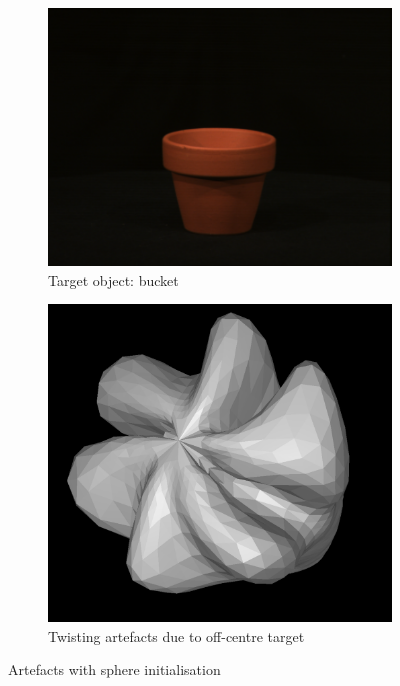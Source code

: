 \documentclass{article}
\begin{document}
\begin{figure}[h!]
  \centering
  \begin{subfigure}{0.25\textwidth}
    \centering
      \includegraphics[width=\textwidth]{images/bucket.png}
      \caption{Target object: bucket}
      \label{bucket}
  \end{subfigure}
  \hfill
  \begin{subfigure}{0.25\textwidth}
    \centering
      \includegraphics[width=\textwidth]{images/bucketartefact.png}
      \caption{Twisting artefacts due to off-centre target}
      \label{bucketfailure}
  \end{subfigure}
  \caption{Artefacts with sphere initialisation}
  \label{buckettarget}
\end{figure}
\end{document}
